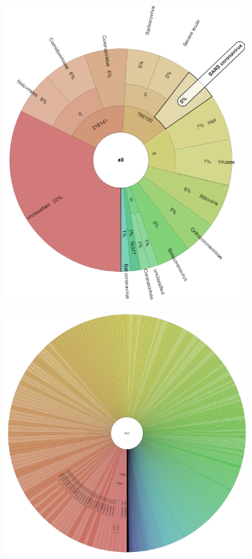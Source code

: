 \begin{figure}[ht!]
\begin{subfigure}[b]{0.3\textwidth}
        \includegraphics[width=1\textwidth]{figures/results/real/krona/krona-ca-sSRR18680489.png}
        \label{fig:results:real:krona-ca-b}
        \end{subfigure}
        \hfill
        \begin{subfigure}[b]{0.3\textwidth}
        \includegraphics[width=1\textwidth]{figures/results/real/krona/krona-ca-all.png}

\end{subfigure}
\end{figure}
